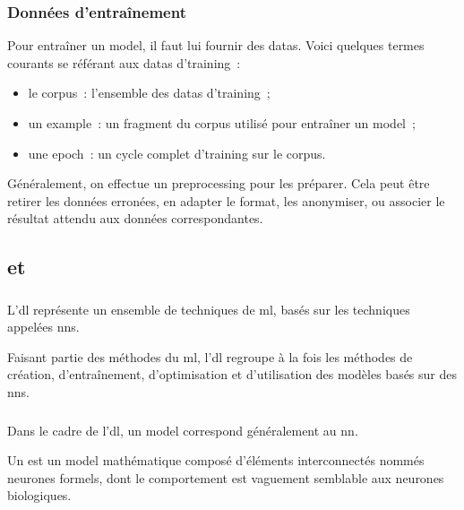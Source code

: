 \subsubsection{Données d'entraînement} \label{def:preprocessing} \label{def:corpus} \label{def:data} \label{def:example} \label{def:epoch}
Pour entraîner un \gls{model}, il faut lui fournir des \glspl{data}.
%
Voici quelques termes courants se référant aux \glspl{data} d'\gls{training}~:
\begin{itemize}
	\item le \gls{corpus}~: l'ensemble des \glspl{data} d'\gls{training}~;
	\item un \gls{example}~: un fragment du \gls{corpus} utilisé pour entraîner un \gls{model}~;
	\item une \gls{epoch}~: un cycle complet d'\gls{training} sur le \gls{corpus}.
\end{itemize}
\vspace{1em}

Généralement, on effectue un \gls{preprocessing} pour les préparer. Cela peut être retirer les données erronées, en adapter le format, les anonymiser, ou associer le résultat attendu aux données correspondantes.

\subsection{ et }
\subsubsection{} \label{subsec:dl} \label{def:dl}
L'\gls{dl} représente un ensemble de techniques de \gls{ml}, basés sur les techniques appelées \glspl{nn}.

Faisant partie des méthodes du \gls{ml}, l'\gls{dl} regroupe à la fois les méthodes de création, d'entraînement, d'optimisation et d'utilisation des modèles basés sur des \glspl{nn}.

\subsubsection{} \label{def:nn}
Dans le cadre de l'\gls{dl}, un \gls{model} correspond généralement au \gls{nn}.

Un  est un \gls{model} mathématique composé d'éléments interconnectés nommés neurones formels, dont le comportement est vaguement semblable aux neurones biologiques.

